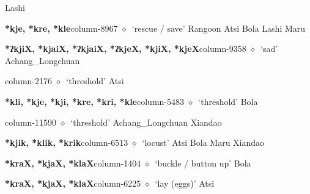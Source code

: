 \hspace{1ex}
         Lashi 
  \item {\footnotesize \textbf{*kje, *kre, *kle}}{\tiny column-8967}
         $\diamond$~`rescue / save'
         Rangoon 
\hspace{1ex}
         Atsi 
\hspace{1ex}
         Bola 
\hspace{1ex}
         Lashi 
\hspace{1ex}
         Maru 
  \item {\footnotesize \textbf{*ʔkjiX, *kjaiX, *ʔkjaiX, *ʔkjeX, *kjiX, *kjeX}}{\tiny column-9358}
         $\diamond$~`sad'
         Achang\_Longchuan 
  \item {\footnotesize \textbf{}}{\tiny column-2176}
         $\diamond$~`threshold'
         Atsi 
  \item {\footnotesize \textbf{*kli, *kje, *kji, *kre, *kri, *kle}}{\tiny column-5483}
         $\diamond$~`threshold'
         Bola 
  \item {\footnotesize \textbf{}}{\tiny column-11590}
         $\diamond$~`threshold'
         Achang\_Longchuan 
\hspace{1ex}
         Xiandao 
  \item {\footnotesize \textbf{*kjik, *klik, *krik}}{\tiny column-6513}
         $\diamond$~`locust'
         Atsi 
\hspace{1ex}
         Bola 
\hspace{1ex}
         Maru 
\hspace{1ex}
         Xiandao 
  \item {\footnotesize \textbf{*kraX, *kjaX, *klaX}}{\tiny column-1404}
         $\diamond$~`buckle / button up'
         Bola 
  \item {\footnotesize \textbf{*kraX, *kjaX, *klaX}}{\tiny column-6225}
         $\diamond$~`lay (eggs)'
         Atsi 
\hspace{1ex}
